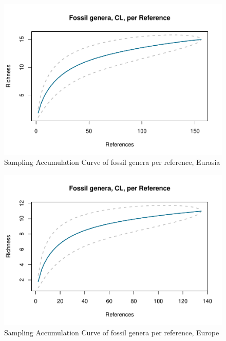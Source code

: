 \documentclass[]{article}
\begin{document}
\begin{figure}[htbp]
\centering
\includegraphics{MA_JJ_files/figure-latex/Species Accumulation Curve with Genera, Eurasia-1.pdf}
\caption{Sampling Accumulation Curve of fossil genera per reference,
Eurasia}
\end{figure}

\begin{figure}[htbp]
\centering
\includegraphics{MA_JJ_files/figure-latex/Species Accumulation Curve with Genera, Europe-1.pdf}
\caption{Sampling Accumulation Curve of fossil genera per reference,
Europe}
\end{figure}
\end{document}
